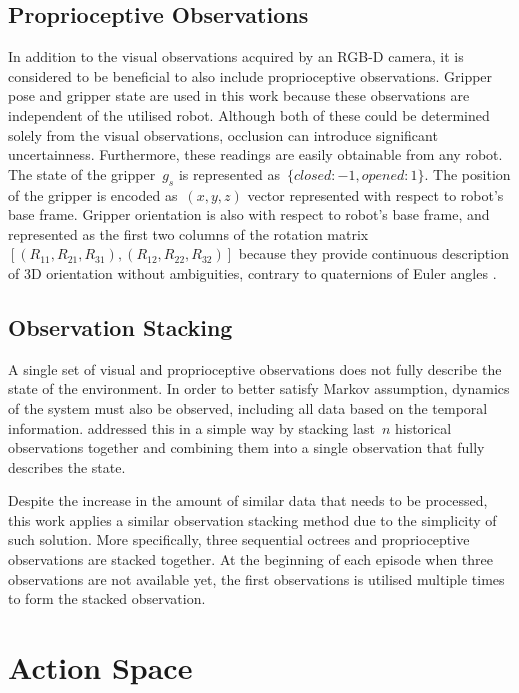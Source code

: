 \subsection{Proprioceptive Observations}\label{subsec:problem_formulation_proprioceptive_observations}

In addition to the visual observations acquired by an RGB-D camera, it is considered to be beneficial to also include proprioceptive observations. Gripper pose and gripper state are used in this work because these observations are independent of the utilised robot. Although both of these could be determined solely from the visual observations, occlusion can introduce significant uncertainness. Furthermore, these readings are easily obtainable from any robot. The state of the gripper~\(g_{s}\) is represented as~\(\{closed: -1, opened: 1\}\). The position of the gripper is encoded as~\((x,y,z)\) vector represented with respect to robot's base frame. Gripper orientation is also with respect to robot's base frame, and represented as the first two columns of the rotation matrix~\([(R_{11},R_{21},R_{31}),(R_{12},R_{22},R_{32})]\) because they provide continuous description of 3D orientation without ambiguities, contrary to quaternions of Euler angles \cite{zhou_continuity_2020}.


\subsection{Observation Stacking}

A single set of visual and proprioceptive observations does not fully describe the state of the environment. In order to better satisfy Markov assumption, dynamics of the system must also be observed, including all data based on the temporal information. \citet{mnih_human-level_2015} addressed this in a simple way by stacking last~\(n\) historical observations together and combining them into a single observation that fully describes the state.

Despite the increase in the amount of similar data that needs to be processed, this work applies a similar observation stacking method due to the simplicity of such solution. More specifically, three sequential octrees and proprioceptive observations are stacked together. At the beginning of each episode when three observations are not available yet, the first observations is utilised multiple times to form the stacked observation.


\section{Action Space}

